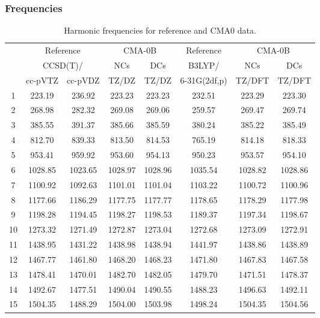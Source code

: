 \documentclass[10pt,oneside]{article}
\begin{document}
\subsubsection*{Frequencies}
\begin{table}[h!]
\centering
\caption{Harmonic frequencies for reference and CMA0 data.}
\begin{tabular}{cccccccc}
\toprule
{} & \multicolumn{2}{c}{Reference} & \multicolumn{2}{c}{CMA-0B} &    Reference & \multicolumn{2}{c}{CMA-0B} \\
{} & \multicolumn{2}{c}{CCSD(T)/} &     NCs &     DCs &       B3LYP/ &     NCs &     DCs \\
{} &   cc-pVTZ & cc-pVDZ &   TZ/DZ &   TZ/DZ & 6-31G(2df,p) &  TZ/DFT &  TZ/DFT \\
\midrule
1  &    223.19 &  236.92 &  223.23 &  223.23 &       232.51 &  223.29 &  223.30 \\
2  &    268.98 &  282.32 &  269.08 &  269.06 &       259.57 &  269.47 &  269.74 \\
3  &    385.55 &  391.37 &  385.66 &  385.59 &       380.24 &  385.22 &  385.49 \\
4  &    812.70 &  839.33 &  813.50 &  814.53 &       765.19 &  814.18 &  818.33 \\
5  &    953.41 &  959.92 &  953.60 &  954.13 &       950.23 &  953.57 &  954.10 \\
6  &   1028.85 & 1023.65 & 1028.97 & 1028.96 &      1035.54 & 1028.82 & 1028.86 \\
7  &   1100.92 & 1092.63 & 1101.01 & 1101.04 &      1103.22 & 1100.72 & 1100.96 \\
8  &   1177.66 & 1186.29 & 1177.75 & 1177.77 &      1178.65 & 1178.29 & 1177.98 \\
9  &   1198.28 & 1194.45 & 1198.27 & 1198.53 &      1189.37 & 1197.34 & 1198.67 \\
10 &   1273.32 & 1271.49 & 1272.87 & 1273.04 &      1272.68 & 1273.09 & 1272.91 \\
11 &   1438.95 & 1431.22 & 1438.98 & 1438.94 &      1441.97 & 1438.86 & 1438.89 \\
12 &   1467.77 & 1461.80 & 1468.20 & 1468.23 &      1471.80 & 1467.83 & 1467.58 \\
13 &   1478.41 & 1470.01 & 1482.70 & 1482.05 &      1479.70 & 1471.51 & 1478.37 \\
14 &   1492.67 & 1477.51 & 1490.04 & 1490.55 &      1488.23 & 1496.63 & 1492.11 \\
15 &   1504.35 & 1488.29 & 1504.00 & 1503.98 &      1498.24 & 1504.35 & 1504.56 \\

\end{tabular}
\end{table}
\end{document}
